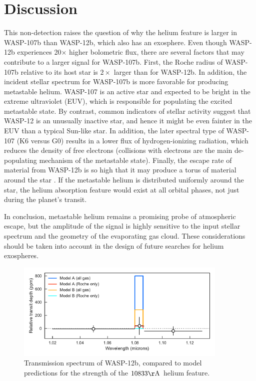 \documentclass[RNAAS]{aastex62}
\begin{document}
\section{Discussion}
This non-detection raises the question of why the helium feature is larger in  
WASP-107b than WASP-12b, which also has an exosphere.  Even though
WASP-12b experiences 20$\times$ higher bolometric flux, there are several factors that may contribute to a
larger signal for WASP-107b. First, the Roche radius of WASP-107b relative to
its host star is $2\times$ larger than for WASP-12b. In addition, the incident stellar spectrum for WASP-107b
is more favorable for producing metastable helium.  WASP-107 is an active star
and expected to be bright in the extreme ultraviolet (EUV), which is responsible for populating the excited metastable
state. By contrast, common indicators of stellar activity suggest that WASP-12
is an unusually inactive star, and hence it might be even fainter in the EUV
than a typical Sun-like star.  In addition, the later spectral type of WASP-107 (K6 versus G0) results
in a lower flux of hydrogen-ionizing radiation, which reduces the density of
free electrons (collisions with electrons are the main de-populating mechanism
of the metastable state).  Finally, the escape rate of material from WASP-12b is
so high that it may produce a torus of material around the star
\citep{haswell17, debrecht18}. If the metastable helium is distributed uniformly
around the star, the helium absorption feature would exist at all orbital phases, not just during the planet's transit.


In conclusion, metastable helium remains a promising probe of atmospheric
escape, but the amplitude of the signal is highly sensitive to the input stellar
spectrum and the geometry of
the evaporating gas cloud.  These considerations should be taken into account in the design of future searches for helium exospheres.

 
\begin{figure}
\begin{centering}
\includegraphics[width = 0.9\textwidth]{fig1.pdf}
\caption{Transmission spectrum of WASP-12b, compared to model predictions for
the strength of the $10833\mathrm{\AA}$ helium feature.}
\end{centering}
\label{fig:spectrum}
\end{figure}
\end{document}
